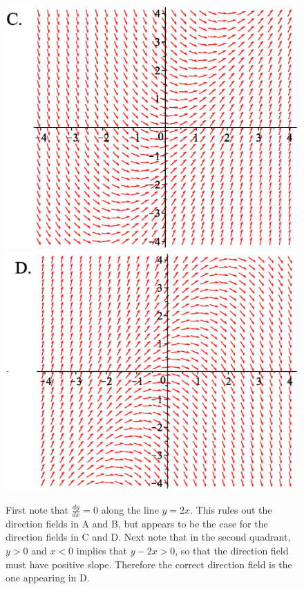 \documentclass[]{ximera}
\begin{document}
\begin{problem}
\begin{figure}[!htb]
\endminipage

\end{figure}

\begin{figure}[!htb]
\hspace{10mm}  
\includegraphics[width=\linewidth]{MCC.eps} 

  \endminipage \hspace{10mm} 
%
  \includegraphics[width=\linewidth]{MCD.eps}

\endminipage

\begin{solution}
First note that $\frac{dy}{dx}=0$ along the line $y=2x$. This rules out the direction fields in A and B, but appears to be the case for the direction fields in C and D. Next note that in the second quadrant, $y > 0$ and $x < 0$ implies that $y-2x > 0$, so that the direction field must have positive slope. Therefore the correct direction field is the one appearing in D.
\end{solution}
\end{figure}


\end{problem}
\end{document}
